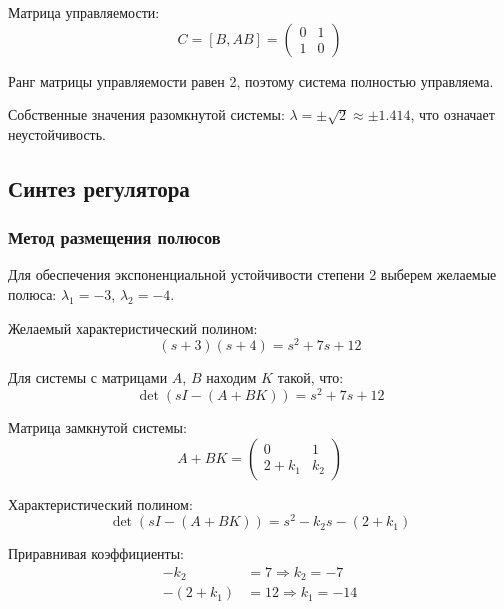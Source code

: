 Матрица управляемости:
\begin{equation}
C = [B, AB] = \begin{pmatrix} 0 & 1 \\ 1 & 0 \end{pmatrix}
\end{equation}

Ранг матрицы управляемости равен 2, поэтому система полностью управляема.

Собственные значения разомкнутой системы: $\lambda = \pm\sqrt{2} \approx \pm 1.414$, что означает неустойчивость.

\subsection*{Синтез регулятора}

\subsubsection*{Метод размещения полюсов}

Для обеспечения экспоненциальной устойчивости степени 2 выберем желаемые полюса: $\lambda_1 = -3$, $\lambda_2 = -4$.

Желаемый характеристический полином:
\begin{equation}
(s + 3)(s + 4) = s^2 + 7s + 12
\end{equation}

Для системы с матрицами $A$, $B$ находим $K$ такой, что:
\begin{equation}
\det(sI - (A + BK)) = s^2 + 7s + 12
\end{equation}

Матрица замкнутой системы:
\begin{equation}
A + BK = \begin{pmatrix} 0 & 1 \\ 2 + k_1 & k_2 \end{pmatrix}
\end{equation}

Характеристический полином:
\begin{equation}
\det(sI - (A + BK)) = s^2 - k_2s - (2 + k_1)
\end{equation}

Приравнивая коэффициенты:
\begin{align}
-k_2 &= 7 \Rightarrow k_2 = -7 \\
-(2 + k_1) &= 12 \Rightarrow k_1 = -14
\end{align}


